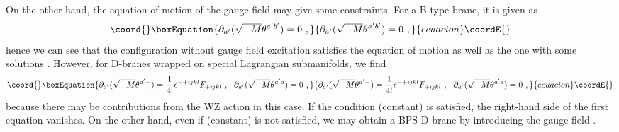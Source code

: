 \documentclass[a4paper,12pt]{article}
\numberwithin{equation}{section}
\DeclareMathOperator*{\im}{{\rm Im}}
\begin{document}
On the other hand, the equation of motion of the gauge field \coordHE{}
may give some constraints. 
For a B-type brane, it is given as
\begin{equation}\coord{}\boxEquation{
 \partial_{a'} (\sqrt{-M} \theta^{a'b'}) = 0 ~,
}{
 \partial_{a'} (\sqrt{-M} \theta^{a'b'}) = 0 ~,
}{ecuacion}\coordE{}\end{equation}
hence we can see that the configuration without gauge field excitation
 satisfies
the equation of motion as well as the one with some solutions \coordHE{}. 
However, for D-branes wrapped on special Lagrangian submanifolds, we find
\begin{equation}\coord{}\boxEquation{
 \partial_{a'} (\sqrt{-M} \theta^{a'-}) = 
 \frac{1}{4!} \epsilon^{-+ijkl} F_{+ijkl} ~,
 ~~ \partial_{a'} (\sqrt{-M} \theta^{a'a}) = 0 ~, 
}{
 \partial_{a'} (\sqrt{-M} \theta^{a'-}) = 
 \frac{1}{4!} \epsilon^{-+ijkl} F_{+ijkl} ~,
 ~~ \partial_{a'} (\sqrt{-M} \theta^{a'a}) = 0 ~, 
}{ecuacion}\coordE{}\end{equation}
because there may be contributions from the WZ action in this case.
If the condition \myHighlight{$\im W=$}\coordHE{}(constant) is satisfied, the right-hand side of the
first equation vanishes. On the other hand, even if \myHighlight{$\im W=$}\coordHE{}(constant) is not
satisfied, we may obtain a BPS D-brane by introducing the gauge field \coordHE{}.
\end{document}
